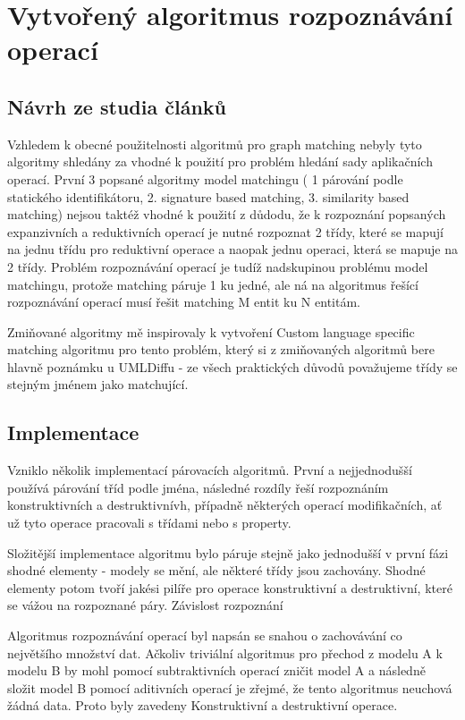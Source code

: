 \documentclass[11pt,twoside,a4paper]{book}
\begin{document}
 
 \section{Vytvořený algoritmus rozpoznávání operací}
 
 \subsection{Návrh ze studia článků}
 
 Vzhledem k obecné použitelnosti algoritmů pro graph matching nebyly tyto
 algoritmy shledány za vhodné k použití pro problém hledání sady
 aplikačních operací. První 3 popsané algoritmy model matchingu ( 1
 párování podle statického identifikátoru, 2. signature based matching, 3.
 similarity based matching) nejsou taktéž vhodné k použití z důdodu, že k rozpoznání popsaných
 expanzivních a reduktivních operací je nutné rozpoznat 2 třídy, které se mapují na jednu třídu pro reduktivní 
 operace a naopak jednu operaci, která se mapuje na 2 třídy. Problém rozpoznávání operací je tudíž nadskupinou problému 
 model matchingu, protože matching páruje 1 ku jedné, ale ná na algoritmus řešící rozpoznávání operací musí řešit 
 matching M entit ku N entitám. 
 
 Zmiňované algoritmy mě inspirovaly k vytvoření Custom language specific matching algoritmu pro tento problém, který si 
 z zmiňovaných algoritmů bere hlavně poznámku u UMLDiffu - ze všech praktických důvodů považujeme třídy se stejným jménem 
 jako matchující.

 \subsection{Implementace}
 Vzniklo několik implementací párovacích algoritmů. První a nejjednodušší
 používá párování tříd podle jména, následné rozdíly řeší rozpoznáním
 konstruktivních a destruktivnívh, případně některých operací modifikačních, ať
 už tyto operace pracovali s třídami nebo s property.
 
 Složitější implementace algoritmu bylo páruje stejně jako jednodušší v
 první fázi shodné elementy - modely se mění, ale některé třídy jsou zachovány.
Shodné elementy potom tvoří jakési pilíře pro operace konstruktivní a
destruktivní, které se vážou na rozpoznané páry. Závislost rozpoznání

Algoritmus rozpoznávání operací byl napsán se snahou o zachovávání co největšího
množství dat. Ačkoliv triviální algoritmus pro přechod z modelu A k modelu B by
mohl pomocí subtraktivních operací zničit model A a následně složit model B
pomocí aditivních operací je zřejmé, že tento algoritmus neuchová žádná data.
Proto byly zavedeny Konstruktivní a destruktivní operace. 
\end{document}
